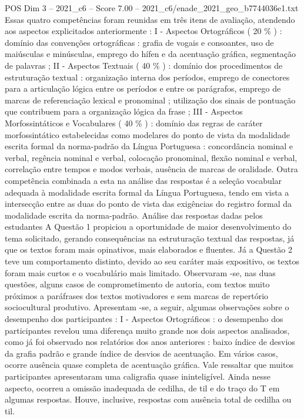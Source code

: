 \begin{textsample}{POS Dim 3 – 2021\_c6 – Score 7.00 – 2021\_c6/enade\_2021\_geo\_b7744036e1.txt}
Essas quatro competências foram reunidas em três itens de avaliação, atendendo aos aspectos explicitados anteriormente : I - Aspectos Ortográficos ( 20 \% ) : domínio das convenções ortográficas : grafia de vogais e consoantes, uso de maiúsculas e minúsculas, emprego do hífen e da acentuação gráfica, segmentação de palavras ; II - Aspectos Textuais ( 40 \% ) : domínio dos procedimentos de estruturação textual : organização interna dos períodos, emprego de conectores para a articulação lógica entre os períodos e entre os parágrafos, emprego de marcas de referenciação lexical e pronominal ; utilização dos sinais de pontuação que contribuem para a organização lógica da frase ; III - Aspectos Morfossintáticos e Vocabulares ( 40 \% ) : domínio das regras de caráter morfossintático estabelecidas como modelares do ponto de vista da modalidade escrita formal da norma-padrão da Língua Portuguesa : concordância nominal e verbal, regência nominal e verbal, colocação pronominal, flexão nominal e verbal, correlação entre tempos e modos verbais, ausência de marcas de oralidade.
Outra competência combinada a esta na análise das respostas é a seleção vocabular adequada à modalidade escrita formal da Língua Portuguesa, tendo em vista a intersecção entre as duas do ponto de vista das exigências do registro formal da modalidade escrita da norma-padrão.
Análise das respostas dadas pelos estudantes A Questão 1 propiciou a oportunidade de maior desenvolvimento do tema solicitado, gerando consequências na estruturação textual das respostas, já que os textos foram mais opinativos, mais elaborados e fluentes.
Já a Questão 2 teve um comportamento distinto, devido ao seu caráter mais expositivo, os textos foram mais curtos e o vocabulário mais limitado.
Observaram -se, nas duas questões, alguns casos de comprometimento de autoria, com textos muito próximos a paráfrases dos textos motivadores e sem marcas de repertório sociocultural produtivo.
Apresentam -se, a seguir, algumas observações sobre o desempenho dos participantes : I - Aspectos Ortográficos : o desempenho dos participantes revelou uma diferença muito grande nos dois aspectos analisados, como já foi observado nos relatórios dos anos anteriores : baixo índice de desvios da grafia padrão e grande índice de desvios de acentuação.
Em vários casos, ocorre ausência quase completa de acentuação gráfica.
Vale ressaltar que muitos participantes apresentaram uma caligrafia quase ininteligível.
Ainda nesse aspecto, ocorreu a omissão inadequada de cedilha, de til e do traço do T em algumas respostas.
Houve, inclusive, respostas com ausência total de cedilha ou til.

\end{textsample}
